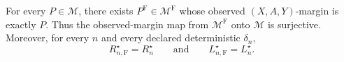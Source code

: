 For every \(P\in\mathcal M\), there exists \(P^{\mathrm F}\in\mathcal M^{\mathrm F}\) whose observed \((X,A,Y)\)-margin is exactly \(P\).  Thus the observed-margin map from \(\mathcal M^{\mathrm F}\) onto \(\mathcal M\) is surjective.  Moreover, for every \(n\) and every declared deterministic \(\delta_n\),
\[
 R_{n,\mathrm F}^\star=R_n^\star
 \qquad\text{and}\qquad
 L_{n,\mathrm F}^\star=L_n^\star.
\]